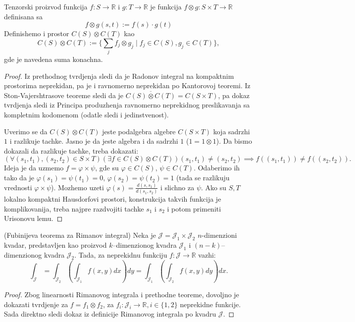 \documentclass[a4paper,12pt]{article}
\newcommand{\RR}{\mathbb{R}}
\begin{document}
\begin{nap}
	Tenzorski proizvod funkcija $f:S\to \RR$ i $g:T\to \RR$ je funkcija $f\otimes g:S\times T \to \RR$
	definisana sa 
	\[ f\otimes g(s, t) := f(s)\cdot g(t) \] 
	Definishemo i prostor $C(S)\otimes C(T)$ kao
	\[ C(S)\otimes C(T) := \Big\{\sum_j f_j\otimes g_j\mid f_j \in C(S), g_j \in C(T)\Big\},\] 
	gde je navedena suma konachna.
\end{nap}
\begin{proof}
	Iz prethodnog tvrdjenja sledi da je Radonov integral na kompaktnim prostorima neprekidan,
	pa je i ravnomerno neprekidan po Kantorovoj teoremi. Iz Ston-Vajershtra\-sove teoreme sledi
	da je $\overline{C(S)\otimes C(T)} = C(S\times T)$, pa dokaz tvrdjenja sledi iz Principa
	produzhenja ravnomerno neprekidnog preslikavanja sa kompletnim kodomenom (odatle 
	sledi i jedinstvenost).
	
	Uverimo se da $C(S)\otimes C(T)$ jeste podalgebra algebre $C(S\times T)$ koja sadrzhi $1$ i razlikuje tachke. 
	Jasno je da jeste algebra i da sadrzhi $1$ ($1 = 1 \otimes 1$). Da bismo dokazali da razlikuje tachke, treba
	dokazati:
	\[ (\forall (s_1, t_1), (s_2, t_2) \in S\times T)(\exists f \in C(S)\otimes C(T))(s_1, t_1)\neq (s_2, t_2) \implies f((s_1, t_1)) \neq f((s_2, t_2)) .\] 
	Ideja je da uzmemo $f=\varphi \times \psi$, gde su $\varphi \in C(S)$, $\psi \in C(T)$. Odaberimo ih tako da je 
	$\varphi(s_1) = \psi(t_1) = 0$, $\varphi(s_2) = \psi(t_2) = 1$ (tada se razlikuju vrednosti $\varphi\times\psi$).
	Mozhemo uzeti $\varphi(s) = \frac{d(s, s_1)}{d(s_1, s_2)}$ i slichno za $\psi$. Ako su $S, T$ lokalno kompaktni Hausdorfovi prostori,
	konstrukcija takvih funkcija je komplikovanija, treba najpre razdvojiti tachke $s_1$ i $s_2$ i potom primeniti Urisonovu lemu.
\end{proof}

\begin{posl}(Fubinijeva teorema za Rimanov integral)
	Neka je $\mathcal{J} = \mathcal{J}_1 \times \mathcal{J}_2$ $n$-dimenzioni kvadar,
	predstavljen kao proizvod $k$--dimenzionog kvadra $\mathcal J_1$ i $(n-k)$--dimenzionog kvadra $\mathcal J_2$.
	Tada, za neprekidnu funkciju $f:\mathcal{J}\to \RR$ vazhi:
	\[ \int_{\mathcal J} = \int_{\mathcal J_2} \left(\int_{\mathcal J_1}f(x, y) dx \right) dy = \int_{\mathcal J_1} \left(\int_{\mathcal J_2}f(x, y) dy \right) dx.\] 
\end{posl}
\begin{proof}
	Zbog linearnosti Rimanovog integrala i prethodne teoreme, dovoljno je dokazati tvrdjenje
	za $f = f_1 \otimes f_2$, za $f_i:\mathcal J_i \to \RR, i \in \{1, 2\}$ neprekidne funkcije.
	Sada direktno sledi dokaz iz definicije Rimanovog integrala po kvadru $\mathcal J$.
\end{proof}
\end{document}
